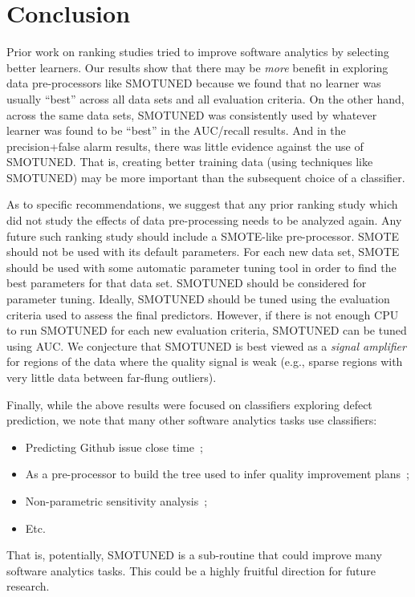 \documentclass[sigconf,review, anonymous]{acmart}
\newcommand{\bi}{\begin{itemize}[leftmargin=0.4cm]}
\newcommand{\ei}{\end{itemize}}
\theoremstyle{break}
\theoremstyle{break}
\newcommand{\sma}{{\sc SMOTE}}
\newcommand{\smb}{{\sc SMOTUNED}}
\begin{document}
\section{Conclusion}
\label{sect:conclusion}





Prior work on ranking studies tried to improve software analytics by selecting better learners.
Our results show that there may be {\em more} benefit in exploring data pre-processors like {\smb} because we found  that no  learner  was  usually  
``best''  
across all  data  sets  and  all  evaluation  criteria. On the other hand, across the same data sets,
{\smb} was  consistently  used  by  whatever  learner  was  found  to  be ``best'' in the  AUC/recall results. And in the precision+false alarm results, there was little evidence against the use of {\smb}. That is, creating better training data  (using techniques like {\smb}) may be  more important than  the  subsequent  choice  of a classifier.


As to specific recommendations, we suggest that any prior ranking study  which did not  study the effects of data pre-processing needs to be analyzed again. Any future such ranking study should include a {\sma}-like
 pre-processor. {\sma} should not be used with its default parameters.
 For each new data set, {\sma} should be used with some automatic parameter tuning tool in
order to find the best parameters for that data set. {\smb} should be considered for parameter tuning. Ideally, {\smb} should be tuned using the evaluation criteria used to assess the final predictors. However, if there is not enough CPU to run {\smb} for each new evaluation criteria, {\smb} can be tuned using AUC. We conjecture that {\smb}
is best viewed as a   {\em signal amplifier} for regions of the data where the quality signal is weak  (e.g., sparse regions with very little data between far-flung outliers).



Finally, while the above results were focused on classifiers exploring defect prediction, we note that many other software analytics
tasks use classifiers:
\bi
\item Predicting Github issue close time~\cite{jones17};
\item As a pre-processor to build the tree used to 
infer quality improvement plans~\cite{krishna2017less};
\item Non-parametric sensitivity analysis~\cite{menzies2000practical};
\item Etc.
\ei
That is, potentially, {\smb} is  a sub-routine that could improve many software analytics tasks. This could be a highly fruitful direction for future research.
\end{document}
